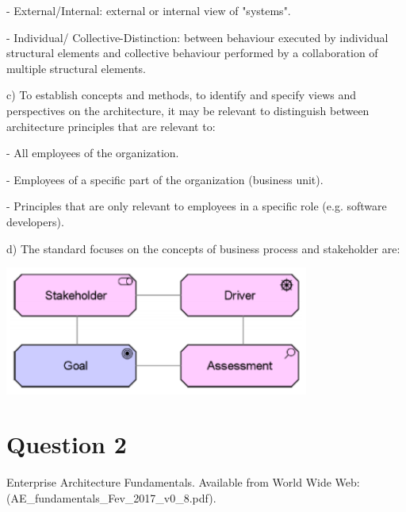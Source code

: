 \documentclass[a4paper,12pt]{texDoc}
\begin{document}
- External/Internal: external or internal view of "systems".

- Individual/ Collective-Distinction: between behaviour executed by individual structural elements and collective behaviour performed by a collaboration of multiple structural elements.

c) To establish concepts and methods, to identify and specify views and perspectives on the architecture, it may be relevant to distinguish between architecture principles that are relevant to:

- All employees of the organization.

- Employees of a specific part of the organization (business unit).

- Principles that are only relevant to employees in a specific role (e.g. software developers).

d) The standard focuses on the concepts of business process and stakeholder are:

\begin{center}
\includegraphics[width=0.75\textwidth]{stakeholders.png}
\end{center}

\section*{Question 2}



\begin{thebibliography}{9}
  Enterprise Architecture Fundamentals. Available from World Wide Web: (AE\_fundamentals\_Fev\_2017\_v0\_8.pdf).
\end{thebibliography}

\end{document}
